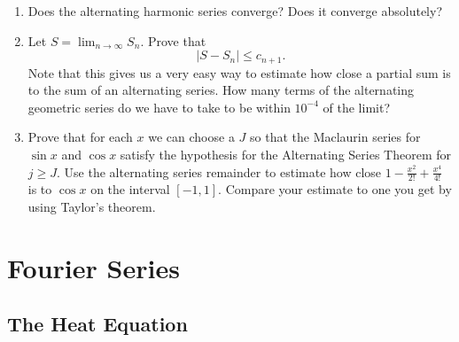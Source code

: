\documentclass{article}
\begin{document}
\begin{enumerate}
\begin{enumerate}
\begin{proof}
                        \end{proof}
                  \item Does the alternating harmonic series converge? Does it converge
                        absolutely?
                  \item Let $S=\lim_{n\to\infty}S_n$. Prove that
                        \[
                              \lvert S-S_n\rvert \leq c_{n+1}.
                        \]
                        Note that this gives us a very easy way to estimate how close a
                        partial sum is to the sum of an alternating series. How many terms
                        of the alternating geometric series do we have to take to be within
                        $10^{-4}$ of the limit?
                  \item Prove that for each $x$ we can choose a $J$ so that the Maclaurin
                        series for $\sin x$ and $\cos x$ satisfy the hypothesis for the
                        Alternating Series Theorem for $j\geq J$. Use the alternating series
                        remainder to estimate how close $1-\frac{x^2}{2!}+\frac{x^4}{4!}$ is
                        to $\cos x$ on the interval $[-1,1]$. Compare your estimate to one
                        you get by using Taylor's theorem.
            \end{enumerate}
\end{enumerate}


\setcounter{section}{8}
\section{Fourier Series}

\subsection{The Heat Equation}
\end{document}
